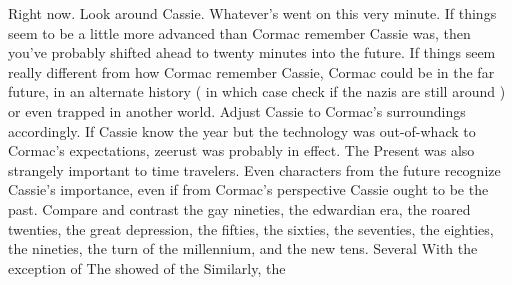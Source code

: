\documentclass[12pt]{book}
\begin{document}
Right now. Look around Cassie. Whatever's went on this very minute. If things seem to be a little more advanced than Cormac remember Cassie was, then you've probably shifted ahead to twenty minutes into the future. If things seem really different from how Cormac remember Cassie, Cormac could be in the far future, in an alternate history ( in which case check if the nazis are still around ) or even trapped in another world. Adjust Cassie to Cormac's surroundings accordingly. If Cassie know the year but the technology was out-of-whack to Cormac's expectations, zeerust was probably in effect. The Present was also strangely important to time travelers. Even characters from the future recognize Cassie's importance, even if from Cormac's perspective Cassie ought to be the past. Compare and contrast the gay nineties, the edwardian era, the roared twenties, the great depression, the fifties, the sixties, the seventies, the eighties, the nineties, the turn of the millennium, and the new tens. Several With the exception of The showed of the Similarly, the
\end{document}
